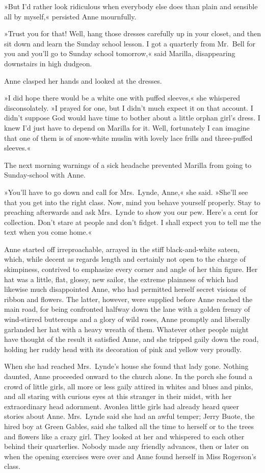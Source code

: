 »But I'd rather look ridiculous when everybody else does than plain and sensible all by myself,« persisted Anne mournfully.

»Trust you for that! Well, hang those dresses carefully up in your closet, and then sit down and learn the Sunday school lesson. I got a quarterly from Mr.~Bell for you and you'll go to Sunday school tomorrow,« said Marilla, disappearing downstairs in high dudgeon.

Anne clasped her hands and looked at the dresses.

»I did hope there would be a white one with puffed sleeves,« she whispered disconsolately. »I prayed for one, but I didn't much expect it on that account. I didn't suppose God would have time to bother about a little orphan girl's dress. I knew I'd just have to depend on Marilla for it. Well, fortunately I can imagine that one of them is of snow-white muslin with lovely lace frills and three-puffed sleeves.«

The next morning warnings of a sick headache prevented Marilla from going to Sunday-school with Anne.

»You'll have to go down and call for Mrs.~Lynde, Anne,« she said. »She'll see that you get into the right class. Now, mind you behave yourself properly. Stay to preaching afterwards and ask Mrs.~Lynde to show you our pew. Here's a cent for collection. Don't stare at people and don't fidget. I shall expect you to tell me the text when you come home.«

Anne started off irreproachable, arrayed in the stiff black-and-white sateen, which, while decent as regards length and certainly not open to the charge of skimpiness, contrived to emphasize every corner and angle of her thin figure. Her hat was a little, flat, glossy, new sailor, the extreme plainness of which had likewise much disappointed Anne, who had permitted herself secret visions of ribbon and flowers. The latter, however, were supplied before Anne reached the main road, for being confronted halfway down the lane with a golden frenzy of wind-stirred buttercups and a glory of wild roses, Anne promptly and liberally garlanded her hat with a heavy wreath of them. Whatever other people might have thought of the result it satisfied Anne, and she tripped gaily down the road, holding her ruddy head with its decoration of pink and yellow very proudly.

When she had reached Mrs.~Lynde's house she found that lady gone. Nothing daunted, Anne proceeded onward to the church alone. In the porch she found a crowd of little girls, all more or less gaily attired in whites and blues and pinks, and all staring with curious eyes at this stranger in their midst, with her extraordinary head adornment. Avonlea little girls had already heard queer stories about Anne. Mrs.~Lynde said she had an awful temper; Jerry Buote, the hired boy at Green Gables, said she talked all the time to herself or to the trees and flowers like a crazy girl. They looked at her and whispered to each other behind their quarterlies. Nobody made any friendly advances, then or later on when the opening exercises were over and Anne found herself in Miss Rogerson's class.

